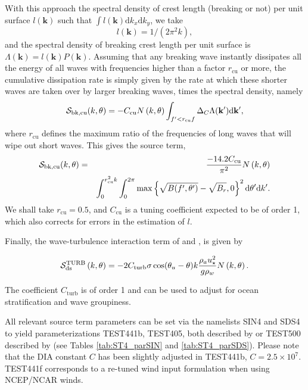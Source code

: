 With this approach the spectral density of crest length (breaking or not) per
unit surface $l(\mathbf{k})$ such that $\int l(\mathbf{k}) \mathrm{d}k_x
\mathrm{d}k_y$, we take
\begin{equation}
l(\mathbf{k})= 1/(2\pi^2 k),
\end{equation}
and the spectral density of breaking crest length per unit surface is
$\Lambda(\mathbf{k})=l(\mathbf{k})P(\mathbf{k})$.  Assuming that any breaking
wave instantly dissipates all the energy of all waves with frequencies higher
than a factor $r_{\mathrm{cu}}$ or more, the cumulative dissipation rate is
simply given by the rate at which these shorter waves are taken over by larger
breaking waves, times the spectral density, namely
\begin{equation}
\cS_{\mathrm{bk,cu}}(k,\theta) = -C_{\mathrm{cu}}  N \left(k,\theta\right) \int_{f' < r_{\mathrm{cu}} f } \Delta_C \Lambda(\mathbf{k'}) \mathrm{d\mathbf{k'}},
\label{Sds_cu1}
\end{equation}
where $r_{\mathrm{cu}}$ defines the maximum ratio of the frequencies of long
waves that will wipe out short waves.  This gives the source term,
\begin{eqnarray}
\cS_{\mathrm{bk,cu}}(k,\theta) &=&  \frac{-14.2 C_{\mathrm{cu}}}{\pi^2}  N \left(k,\theta\right)
 \nonumber \\
& &\int_0^{ r^2_{\mathrm{cu}} k }\int_0^{2\pi}
\max \left\{\sqrt{B(f',\theta')}-\sqrt{B_r},0\right\}^2
\mathrm{d}\theta' \mathrm{d}k'.
\label{Sds_sat_isotropic}
\end{eqnarray}
We shall take $r_{\mathrm{cu}}=0.5$, and $C_{\mathrm{cu}}$ is a tuning
coefficient expected to be of order 1, which also corrects for errors in the
estimation of $l$.


Finally, the wave-turbulence interaction term of \cite{art:TB02} and \cite{art:AJ06},
is given by

\begin{equation}
{\cal S}_{\mathrm{ds}}^{\mathrm{TURB}}\left(k,\theta\right) = - 2
C_{\mathrm{turb}} \sigma \cos(\theta_u - \theta) k \frac{\rho_a
u_\star^2}{g \rho_w}  N\left(k,\theta\right) .
\end{equation}

\noindent
The coefficient $C_{\mathrm{turb}}$ is of order 1 and can be used to adjust for
ocean stratification and wave groupiness.

All relevant source term parameters can be set via the namelists {\F SIN4} and {\F SDS4}
to yield parameterizations TEST441b, TEST405, both described by
\cite{art:Aea10} or TEST500 described by \cite{art:FA12} (see Tables \ref{tab:ST4_parSIN} and \ref{tab:ST4_parSDS}). Please note that the
DIA constant $C$ has been slightly adjusted in TEST441b, $C=2.5\times
10^7$. TEST441f corresponds to a re-tuned wind input formulation when using
NCEP/NCAR winds.

